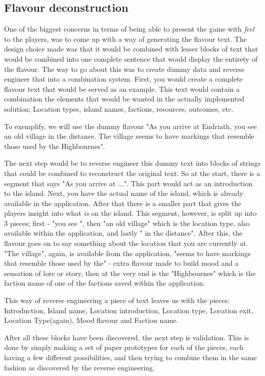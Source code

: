 \subsection{Flavour deconstruction}
\label{sec:flavour}
One of the biggest concerns in terms of being able to present the game with \textit{feel} to the players, was to come up with a way of generating the flavour text. The design choice made was that it would be combined with lesser blocks of text that would be combined into one complete sentence that would display the entirety of the flavour. The way to go about this was to create dummy data and reverse engineer that into a combination system. First, you would create a complete flavour text that would be served as an example. This text would contain a combination the elements that would be wanted in the actually implemented solution; Location types, island names, factions, resources, outcomes, etc.

To exemplify, we will use the dummy flavour "As you arrive at Endriath, you see an old village in the distance. The village seems to have markings that resemble those used by the Highbournes".

The next step would be to reverse engineer this dummy text into blocks of strings that could be combined to reconstruct the original text. So at the start, there is a segment that says "As you arrive at ...". This part would act as an introduction to the island. Next, you have the actual name of the island, which is already available in the application. After that there is a smaller part that gives the players insight into what \textit{is} on the island. This segment, however, is split up into 3 pieces; first - "you see ", then "an old village" which is the location type, also available within the application, and lastly " in the distance". After this, the flavour goes on to say something about the location that you are currently at. "The village", again, is available from the application, "seems to have markings that resemble those used by the" - extra flavour made to build mood and a sensation of lore or story, then at the very end is the "Highbournes" which is the faction name of one of the factions saved within the application.

This way of reverse engineering a piece of text leaves us with the pieces: Introduction, Island name, Location introduction, Location type, Location exit, Location Type(again), Mood flavour and Faction name.

After all these blocks have been discovered, the next step is validation. This is done by simply making a set of paper prototypes for each of the pieces, each having a few different possibilities, and then trying to combine them in the same fashion as discovered by the reverse engineering. 


